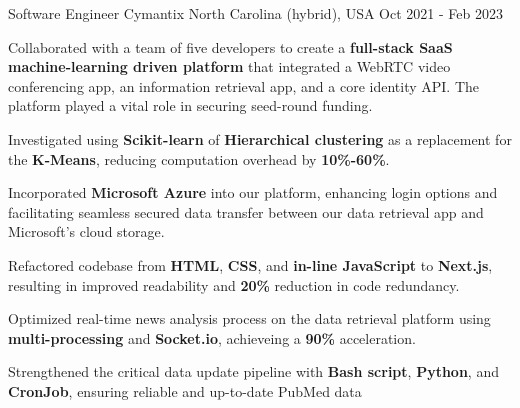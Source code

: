 \begin{cventries}
    \cventry
    {Software Engineer} %
    {Cymantix} %
    {North Carolina (hybrid), USA} %
    {Oct 2021 - Feb 2023} %
    {
      \begin{cvitems} %
        \item {Collaborated with a team of five developers to create a \textbf{full-stack SaaS machine-learning driven platform} that integrated a WebRTC video conferencing app, an information retrieval app, and a core identity API. The platform played a vital role in securing seed-round funding.}
        \item {Investigated using \textbf{Scikit-learn} of \textbf{Hierarchical clustering} as a replacement for the \textbf{K-Means}, reducing computation overhead by \textbf{10\%-60\%}.}
        \item {Incorporated \textbf{Microsoft Azure} into our platform, enhancing login options and facilitating seamless secured data transfer between our data retrieval app and Microsoft's cloud storage.}
        \item {Refactored codebase from \textbf{HTML}, \textbf{CSS}, and \textbf{in-line JavaScript} to \textbf{Next.js}, resulting in improved readability and \textbf{20\%} reduction in code redundancy.}
        \item {Optimized real-time news analysis process on the data retrieval platform using \textbf{multi-processing} and \textbf{Socket.io}, achieveing a \textbf{90\%} acceleration.}
        \item {Strengthened the critical data update pipeline with \textbf{Bash script}, \textbf{Python}, and \textbf{CronJob}, ensuring reliable and up-to-date PubMed data}
      \end{cvitems}
    }


\end{cventries}
